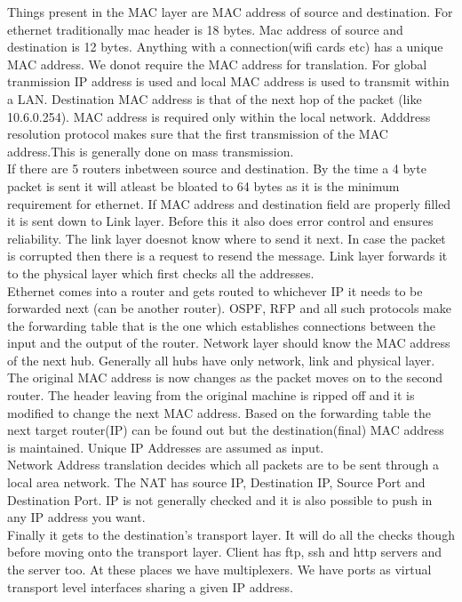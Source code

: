 \documentclass[solution,addpoints,12pt]{exam}
\begin{document}
Things present in the MAC layer are MAC address of source and destination. For
ethernet traditionally
mac header is 18 bytes. Mac address of source and destination is 12 bytes.
Anything with a connection(wifi cards etc) has a unique MAC address. We donot
require the MAC address for translation. For global
tranmission IP address is used and local MAC address is used to transmit within
a LAN. Destination MAC
address is that of the next hop of the packet (like 10.6.0.254). MAC address is
required only within the
local network. Adddress resolution protocol makes sure that the first
transmission of the MAC address.This is generally done on mass transmission.\\

If there are 5 routers inbetween source and destination. By the time a 4 byte
packet is sent
it will atleast be bloated to 64 bytes as it is the minimum requirement for
ethernet. If MAC address and destination field are properly filled it is sent
down to Link layer. Before this it also does error control and ensures
reliability. The link layer doesnot know where to send it next. In case the
packet is corrupted then there is a request to resend the message. Link layer
forwards it to the
physical layer which first checks all the addresses.\\

Ethernet comes into a router and gets routed to whichever IP it needs to be
forwarded next (can be another router). OSPF, RFP and all such protocols make
the forwarding table that is the one
which establishes connections between the input and the output of the router.
Network
layer should know the MAC address of the next hub. Generally all hubs have only
network, link
and physical layer. The original MAC address is now changes as the packet moves
on to the second router.
The header leaving from the original machine is ripped off and it is modified
to change the next MAC address. Based on the forwarding table the next target
router(IP) can be found out but the destination(final) MAC address is
maintained. Unique IP Addresses are assumed as input.\\

Network Address translation decides which all packets are to be sent through a
local area network.
The NAT has source IP, Destination IP, Source Port and Destination Port. IP
is not generally checked and it is also possible to push in any IP address you
want.\\

Finally it gets to the destination's transport layer. It will do all the checks
though before moving onto
the transport layer. Client has ftp, ssh and http servers and the server too.
At these places
we have multiplexers. We have ports as virtual transport level interfaces
sharing a given IP address.\\
\end{document}

